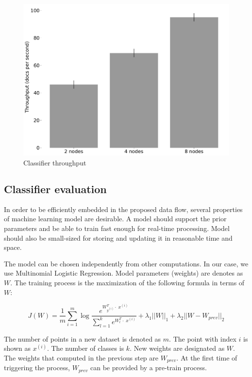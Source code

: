 \begin{figure}[htbp]
  \centering
  \includegraphics[scale=0.25]{pics/classifier_throughput}
  \caption{Classifier throughput}
  \label {throughput}
\end{figure}

\subsection{Classifier evaluation}

In order to be efficiently embedded in the proposed data flow, several properties of machine learning model are desirable. A model should support the prior parameters and be able to train fast enough for real-time processing. Model should also be small-sized for storing and updating it in reasonable time and space.

The model can be chosen independently from other computations. In our case, we use Multinomial Logistic Regression. Model parameters (weights) are denotes as $W$. The training process is the maximization of the following formula in terms of $W$:

\begin{center}

$$ J(W) = \frac{1}{m} \sum \limits_{i = 1}^{m} \log \frac{e^{{W_{y^{(i)}}^T \cdot \; x^{(i)}}}}{\sum \limits_{l = 1}^{k}  e^{{W_{l}^T \cdot \; x^{(i)}}}} + \lambda_1 ||W||_1 + \lambda_2 ||W - W_{prev}||_2 $$

\end{center} 

The number of points in a new dataset is denoted as $m$. The point with index $i$ is shown as $x^{(i)}$. The number of classes is $k$. New weights are designated as $W$. The weights that computed in the previous step are $W_{prev}$. At the first time of triggering the process, $W_{prev}$ can be provided by a pre-train process.  

